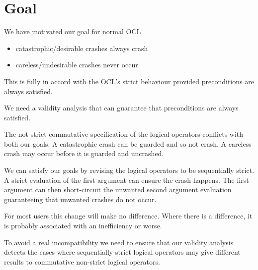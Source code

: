 \documentclass{llncs}
\begin{document}
\section{Goal}\label{Goal}

We have motivated our goal for normal OCL
\begin{itemize}
	\item catastrophic/desirable crashes always crash
	\item careless/undesirable crashes never occur
\end{itemize}

This is fully in accord with the OCL's strict behaviour provided preconditions are always satisfied.

We need a validity analysis that can guarantee that preconditions are always satisfied.

The not-strict commutative specification of the logical operators conflicts with both our goals. A catastrophic crash can be guarded and so not crash. A careless crash may occur before it is guarded and uncrashed.

We can satisfy our goals by revising the logical operators to be sequentially strict. A strict evaluation of the first argument can ensure the crash happens. The first argument can then short-circuit the unwanted second argument evaluation guaranteeing that unwanted crashes do not occur.

For most users this change will make no difference. Where there is a difference, it is probably associated with an inefficiency or worse.

To avoid a real incompatibility we need to ensure that our validity analysis detects the cases where sequentially-strict logical operators may give different results to commutative non-strict logical operators.
 




\end{document}
